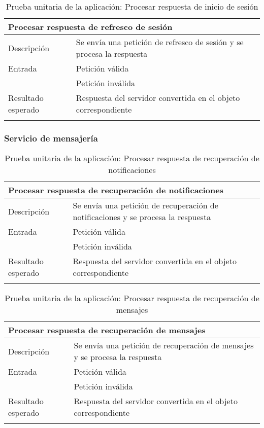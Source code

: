 \begin{longtable}{|p{} p{}|}
    \hline
    \multicolumn{2}{|l|}{\textbf{Procesar respuesta de refresco de sesión}} \\ \hline 
    Descripción                 & Se envía una petición de refresco de sesión y se procesa la respuesta \\ \hline
    Entrada                     & Petición válida \\
                                & Petición inválida \\ \hline
    Resultado esperado          & Respuesta del servidor convertida en el objeto correspondiente \\ \hline
    \caption{Prueba unitaria de la aplicación: Procesar respuesta de inicio de sesión}
    \label{cp:u:app:respuesta_refresco_sesion}
\end{longtable}
    
\vspace{-21pt}
\subsubsection{Servicio de mensajería}

\vspace{-5pt}
\begin{longtable}{|p{} p{}|}
    \hline
    \multicolumn{2}{|l|}{\textbf{Procesar respuesta de recuperación de notificaciones}} \\ \hline 
    Descripción                 & Se envía una petición de recuperación de notificaciones y se procesa la respuesta \\ \hline
    Entrada                     & Petición válida \\
                                & Petición inválida \\ \hline
    Resultado esperado          & Respuesta del servidor convertida en el objeto correspondiente \\ \hline
    \caption{Prueba unitaria de la aplicación: Procesar respuesta de recuperación de notificaciones}
    \label{cp:u:app:respuesta_recuperacion_notificaciones}
\end{longtable}

\vspace{-16pt}
\begin{longtable}{|p{} p{}|}
    \hline
    \multicolumn{2}{|l|}{\textbf{Procesar respuesta de recuperación de mensajes}} \\ \hline 
    Descripción                 & Se envía una petición de recuperación de mensajes y se procesa la respuesta \\ \hline
    Entrada                     & Petición válida \\
                                & Petición inválida \\ \hline
    Resultado esperado          & Respuesta del servidor convertida en el objeto correspondiente \\ \hline
    \caption{Prueba unitaria de la aplicación: Procesar respuesta de recuperación de mensajes}
    \label{cp:u:app:respuesta_recuperacion_mensajes}
\end{longtable}
    
